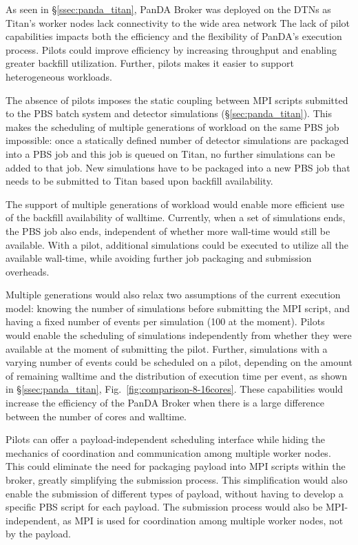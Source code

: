 As seen in \S\ref{ssec:panda_titan}, PanDA Broker was  deployed on the DTNs
as Titan's worker nodes lack connectivity to the wide area network The lack of
pilot capabilities impacts both the efficiency and the flexibility of PanDA's
execution process. Pilots could improve efficiency by increasing throughput and
enabling greater backfill utilization. Further, pilots makes it easier to
support heterogeneous workloads.

The absence of pilots imposes the static coupling between MPI scripts
submitted to the PBS batch system and detector simulations
(\S\ref{sec:panda_titan}). This makes the scheduling of multiple generations
of workload on the same PBS job impossible: once a statically defined number
of detector simulations are packaged into a PBS job and this job is queued on
Titan, no further simulations can be added to that job. New simulations have
to be packaged into a new PBS job that needs to be submitted to Titan based
upon backfill availability.

The support of  multiple generations of workload would enable more efficient use
of the backfill availability of walltime. Currently, when a set of simulations
ends, the PBS job also ends, independent of whether more wall-time would still
be available. With a pilot, additional simulations could be executed  to utilize
all the available wall-time, while avoiding further job packaging and submission
overheads.

Multiple generations would also relax two assumptions of the current execution
model: knowing the number of simulations before submitting the MPI script, and
having a fixed number of events per simulation (100 at the moment). Pilots would
enable the scheduling of simulations independently from whether they were
available at the moment of submitting the pilot. Further, simulations with a
varying number of events could be scheduled on a pilot, depending on the amount
of remaining walltime and the distribution of execution time per event, as shown
in \S\ref{ssec:panda_titan}, Fig.~\ref{fig:comparison-8-16cores}. These
capabilities would increase the efficiency of the PanDA Broker when there is a
large difference between the number of cores and walltime.

Pilots can offer a payload-independent scheduling interface while hiding the
mechanics of coordination and communication among multiple worker nodes. This
could eliminate the need for packaging payload into MPI scripts within the
broker, greatly simplifying the submission process. This simplification would
also enable the submission of different types of payload, without having to
develop a specific PBS script for each payload. The submission process would
also be MPI-independent, as MPI is used for coordination among multiple worker
nodes, not by the payload.

